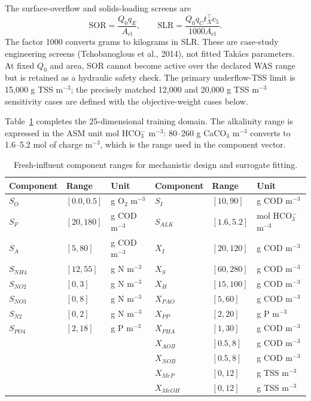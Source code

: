 \documentclass[a4paper,fleqn]{cas-sc}
\begin{document}
The surface-overflow and solids-loading screens are
\begin{equation}
\label{eq:clarifier_loadings}
\mathrm{SOR}=\frac{Q_0q_E}{A_{\mathrm{cl}}},
\qquad
\mathrm{SLR}=\frac{Q_0q_Ct_X^\top c_5}{1000A_{\mathrm{cl}}}.
\end{equation}
The factor 1000 converts grams to kilograms in SLR. These are case-study engineering screens (Tchobanoglous et al., 2014), not fitted Tak\'acs parameters. At fixed $Q_0$ and area, SOR cannot become active over the declared WAS range but is retained as a hydraulic safety check. The primary underflow-TSS limit is 15,000 g TSS m$^{-3}$; the precisely matched 12,000 and 20,000 g TSS m$^{-3}$ sensitivity cases are defined with the objective-weight cases below.

Table~\ref{tab:influent_ranges} completes the 25-dimensional training domain. The alkalinity range is expressed in the ASM unit mol HCO$_3^-$ m$^{-3}$: 80--260 g CaCO$_3$ m$^{-3}$ converts to 1.6--5.2 mol of charge m$^{-3}$, which is the range used in the component vector.

\begin{table}[htbp]
\centering
\caption{Fresh-influent component ranges for mechanistic design and surrogate fitting.}
\label{tab:influent_ranges}
\scriptsize
\begin{tabular}{llllll}
\toprule
Component & Range & Unit & Component & Range & Unit \\
\midrule
$S_O$ & $[0.0,0.5]$ & g O$_2$ m$^{-3}$ & $S_I$ & $[10,90]$ & g COD m$^{-3}$ \\
$S_F$ & $[20,180]$ & g COD m$^{-3}$ & $S_{ALK}$ & $[1.6,5.2]$ & mol HCO$_3^-$ m$^{-3}$ \\
$S_A$ & $[5,80]$ & g COD m$^{-3}$ & $X_I$ & $[20,120]$ & g COD m$^{-3}$ \\
$S_{NH4}$ & $[12,55]$ & g N m$^{-3}$ & $X_S$ & $[60,280]$ & g COD m$^{-3}$ \\
$S_{NO2}$ & $[0,3]$ & g N m$^{-3}$ & $X_H$ & $[15,100]$ & g COD m$^{-3}$ \\
$S_{NO3}$ & $[0,8]$ & g N m$^{-3}$ & $X_{PAO}$ & $[5,60]$ & g COD m$^{-3}$ \\
$S_{N2}$ & $[0,2]$ & g N m$^{-3}$ & $X_{PP}$ & $[2,20]$ & g P m$^{-3}$ \\
$S_{PO4}$ & $[2,18]$ & g P m$^{-3}$ & $X_{PHA}$ & $[1,30]$ & g COD m$^{-3}$ \\
 & & & $X_{AOB}$ & $[0.5,8]$ & g COD m$^{-3}$ \\
 & & & $X_{NOB}$ & $[0.5,8]$ & g COD m$^{-3}$ \\
 & & & $X_{MeP}$ & $[0,12]$ & g TSS m$^{-3}$ \\
 & & & $X_{MeOH}$ & $[0,12]$ & g TSS m$^{-3}$ \\
\bottomrule
\end{tabular}
\end{table}
\end{document}
